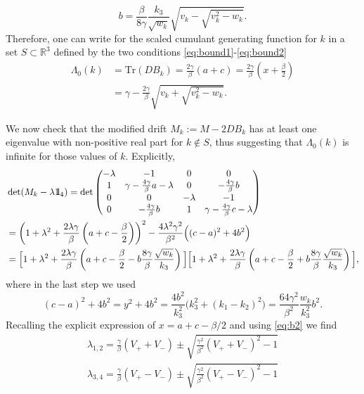 \documentclass[a4paper,11pt]{article}
\numberwithin{equation}{section}
\newcommand{\bbbone}{\mathchoice {\rm 1\mskip-4mu l} {\rm 1\mskip-4mu l}
{\rm 1\mskip-4.5mu l} {\rm 1\mskip-5mu l}}
\begin{document}
\begin{equation}\label{eq:b2}
    b= \frac{\beta}{8\gamma} \frac{k_3}{\sqrt{w_k}}\sqrt{  v_k - \sqrt{v_k^2 - w_k}}.
\end{equation}
Therefore, one can write for the scaled cumulant generating function for $k$ in a set $S \subset \mathbb{R}^3$ defined by the two conditions \eqref{eq:bound1}-\eqref{eq:bound2}
\begin{align}
    \Lambda_0(k) &= \mathrm{Tr}(D B_k) = \frac{2\gamma}{\beta} (a+c)= \frac{2\gamma}{\beta}\left( x+ \frac{\beta}{2} \right) \nonumber\\
    &= \gamma - \frac{2\gamma}{\beta}\sqrt{  v_k + \sqrt{v_k^2 - w_k}} .
\end{align}

We now check that the modified drift $M_k := M - 2D B_k$ has at least one eigenvalue with non-positive real part for $k \notin S$, thus suggesting that $\Lambda_0(k)$ is infinite for those values of $k$.
Explicitly,
\begin{align}
    &\det(M_k - \lambda \bbbone_4) = 
    \det 
    \begin{pmatrix}
     -\lambda & -1 & 0 & 0 \\
     1 & \gamma - \frac{4 \gamma}{\beta}a -\lambda & 0 & - \frac{4 \gamma}{\beta}b \\
     0 & 0 & -\lambda & -1 \\
     0 & - \frac{4 \gamma}{\beta}b & 1 & \gamma - \frac{4 \gamma}{\beta}c - \lambda
    \end{pmatrix} \nonumber \\
    &= \left( 1 + \lambda^2 + \frac{2\lambda\gamma}{\beta}\left(a +c - \frac{\beta}{2}\right) \right)^2  - \frac{4\lambda^2 \gamma^2}{\beta^2}\Big( (c-a)^2 + 4b^2 \Big) \\
    &= \Big[ 1 + \lambda^2 + \frac{2\lambda \gamma}{\beta}\left(a+c - \frac{\beta}{2} - b \frac{8\gamma}{\beta} \frac{\sqrt{w_k}}{k_3}\right) \Big] \Big[ 1 + \lambda^2 + \frac{2\lambda \gamma}{\beta}\left(a+c - \frac{\beta}{2} + b \frac{8\gamma}{\beta} \frac{\sqrt{w_k}}{k_3}\right)  \Big] ,
\end{align}
where in the last step we used 
\begin{equation*}
    (c-a)^2 + 4b^2 = y^2 + 4b^2 = \frac{4b^2}{k_3^2} \Big(k_3^2 + (k_1 - k_2)^2 \Big) = \frac{64 \gamma^2}{\beta^2}\frac{w_k}{k_3^2} b^2 .
\end{equation*}
Recalling the explicit expression of $x=a+c-\beta/2$ and using \eqref{eq:b2} we find
\begin{align}
    \lambda_{1,2}= \frac{\gamma}{\beta}\left( V_+ + V_- \right) \pm \sqrt{\frac{\gamma^2}{\beta^2}\left(V_+ + V_- \right)^2 -1} \\
    \lambda_{3,4}= \frac{\gamma}{\beta}\left( V_+ - V_- \right) \pm \sqrt{\frac{\gamma^2}{\beta^2}\left(V_+ - V_- \right)^2 -1}
\end{align}
\end{document}
